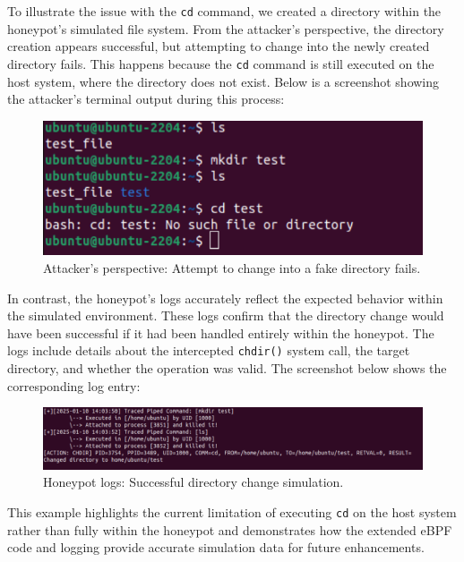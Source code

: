 To illustrate the issue with the \texttt{cd} command, we created a directory within the honeypot's simulated file system. From the attacker's perspective, the directory creation appears successful, but attempting to change into the newly created directory fails. This happens because the \texttt{cd} command is still executed on the host system, where the directory does not exist. Below is a screenshot showing the attacker's terminal output during this process:

\begin{figure}[H]
    \centering
    \includegraphics[width=1\linewidth]{bilder/attacker.png}
    \caption{Attacker's perspective: Attempt to change into a fake directory fails.}
\end{figure}

In contrast, the honeypot's logs accurately reflect the expected behavior within the simulated environment. These logs confirm that the directory change would have been successful if it had been handled entirely within the honeypot. The logs include details about the intercepted \texttt{chdir()} system call, the target directory, and whether the operation was valid. The screenshot below shows the corresponding log entry:

\begin{figure}[H]
    \centering
    \includegraphics[width=1\linewidth]{bilder/logs.png}
    \caption{Honeypot logs: Successful directory change simulation.}
\end{figure}

This example highlights the current limitation of executing \texttt{cd} on the host system rather than fully within the honeypot and demonstrates how the extended eBPF code and logging provide accurate simulation data for future enhancements.

